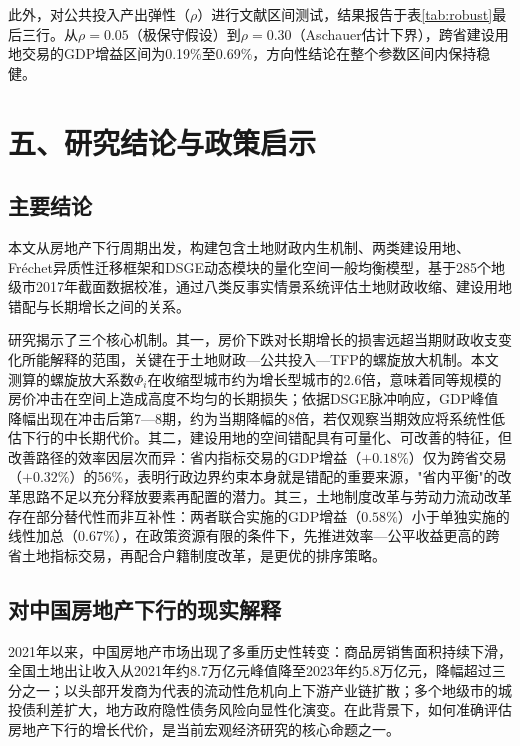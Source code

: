 \documentclass[UTF8,a4paper,12pt]{ctexart}
\theoremstyle{plain}
\theoremstyle{definition}
\theoremstyle{remark}
\begin{document}
此外，对公共投入产出弹性（$\rho$）进行文献区间测试，结果报告于表\ref{tab:robust}最后三行。从$\rho=0.05$（极保守假设）到$\rho=0.30$（Aschauer估计下界），跨省建设用地交易的GDP增益区间为0.19\%至0.69\%，方向性结论在整个参数区间内保持稳健。

\section{五、研究结论与政策启示}

\subsection{主要结论}

本文从房地产下行周期出发，构建包含土地财政内生机制、两类建设用地、Fréchet异质性迁移框架和DSGE动态模块的量化空间一般均衡模型，基于285个地级市2017年截面数据校准，通过八类反事实情景系统评估土地财政收缩、建设用地错配与长期增长之间的关系。

研究揭示了三个核心机制。其一，房价下跌对长期增长的损害远超当期财政收支变化所能解释的范围，关键在于土地财政—公共投入—TFP的螺旋放大机制。本文测算的螺旋放大系数$\Phi_i$在收缩型城市约为增长型城市的2.6倍，意味着同等规模的房价冲击在空间上造成高度不均匀的长期损失；依据DSGE脉冲响应，GDP峰值降幅出现在冲击后第7—8期，约为当期降幅的8倍，若仅观察当期效应将系统性低估下行的中长期代价。其二，建设用地的空间错配具有可量化、可改善的特征，但改善路径的效率因层次而异：省内指标交易的GDP增益（$+0.18\%$）仅为跨省交易（$+0.32\%$）的56\%，表明行政边界约束本身就是错配的重要来源，"省内平衡"的改革思路不足以充分释放要素再配置的潜力。其三，土地制度改革与劳动力流动改革存在部分替代性而非互补性：两者联合实施的GDP增益（$0.58\%$）小于单独实施的线性加总（$0.67\%$），在政策资源有限的条件下，先推进效率—公平收益更高的跨省土地指标交易，再配合户籍制度改革，是更优的排序策略。

\subsection{对中国房地产下行的现实解释}

2021年以来，中国房地产市场出现了多重历史性转变：商品房销售面积持续下滑，全国土地出让收入从2021年约8.7万亿元峰值降至2023年约5.8万亿元，降幅超过三分之一；以头部开发商为代表的流动性危机向上下游产业链扩散；多个地级市的城投债利差扩大，地方政府隐性债务风险向显性化演变。在此背景下，如何准确评估房地产下行的增长代价，是当前宏观经济研究的核心命题之一。
\end{document}
